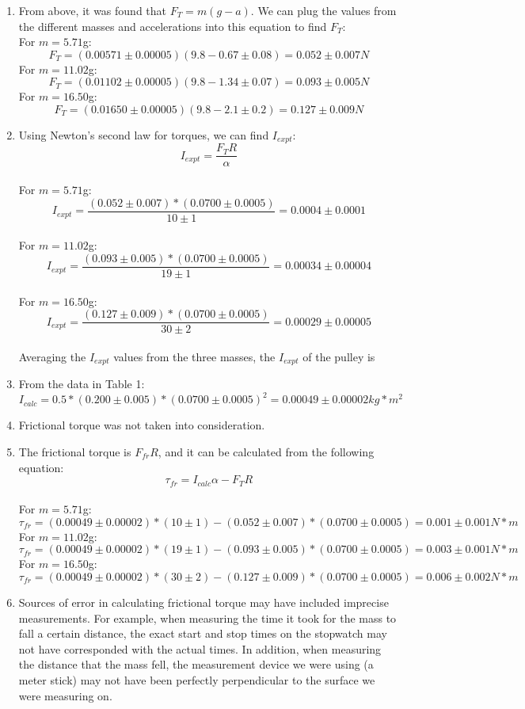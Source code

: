 \documentclass[10pt, letterpaper]{article}
\begin{document}
\begin{enumerate}
  \item From above, it was found that $F_T = m(g-a)$. We can plug the values from the different masses and accelerations into this equation to find $F_T$: \\
    For $m = 5.71$g:
      \[ F_T = (0.00571 \pm 0.00005)(9.8 - 0.67 \pm 0.08) = \boxed{0.052 \pm 0.007 N} \]
    For $m = 11.02$g:
      \[ F_T = (0.01102 \pm 0.00005)(9.8 - 1.34 \pm 0.07) = \boxed{0.093 \pm 0.005 N} \]
    For $m = 16.50$g:
      \[ F_T = (0.01650 \pm 0.00005)(9.8 - 2.1 \pm 0.2) =  \boxed{0.127 \pm 0.009 N} \]
  \item Using Newton's second law for torques, we can find $I_{expt}$:
    \[ I_{expt} = \frac{F_{T}R}{\alpha } \] \\
    For $m = 5.71$g:
      \[ I_{expt} = \frac{(0.052 \pm 0.007)* (0.0700 \pm 0.0005)}{10 \pm 1} = 0.0004 \pm 0.0001 \] \\
    For $m = 11.02$g:
      \[ I_{expt} = \frac{(0.093 \pm 0.005)*(0.0700 \pm 0.0005)}{19 \pm 1} = 0.00034 \pm 0.00004 \] \\
    For $m = 16.50$g:
      \[ I_{expt} = \frac{(0.127 \pm 0.009)*(0.0700 \pm 0.0005)}{30 \pm 2} = 0.00029 \pm 0.00005 \] \\
    Averaging the $I_{expt}$ values from the three masses, the $I_{expt}$ of the pulley is 
  \item From the data in Table 1:
      \[I_{calc} = 0.5*(0.200 \pm 0.005)*(0.0700 \pm 0.0005)^2 = \boxed{0.00049 \pm 0.00002 kg*m^2} \]
  \item Frictional torque was not taken into consideration.
  \item The frictional torque is $F_{fr}R$, and it can be calculated from the following equation:
    \[ \tau _{fr} = I_{calc}\alpha - F_{T}R \] \\
    For $m = 5.71$g:
      \[ \tau _{fr} = (0.00049 \pm 0.00002)*(10 \pm 1) - (0.052 \pm 0.007)*(0.0700 \pm 0.0005) = \boxed{0.001 \pm 0.001 N*m} \]
    For $m = 11.02$g:
      \[ \tau _{fr} = (0.00049 \pm 0.00002)*(19 \pm 1) - (0.093 \pm 0.005)*(0.0700 \pm 0.0005) = \boxed{0.003 \pm 0.001 N*m} \]
    For $m = 16.50$g:
      \[ \tau _{fr} = (0.00049 \pm 0.00002)*(30 \pm 2) - (0.127 \pm 0.009)*(0.0700 \pm 0.0005) = \boxed{0.006 \pm 0.002 N*m} \]
  \item Sources of error in calculating frictional torque may have included imprecise measurements. For example, when measuring the time
        it took for the mass to fall a certain distance, the exact start and stop times on the stopwatch may not have corresponded with the
        actual times. In addition, when measuring the distance that the mass fell, the measurement device we were using (a meter stick) may
        not have been perfectly perpendicular to the surface we were measuring on.
\end{enumerate}
\end{document}
